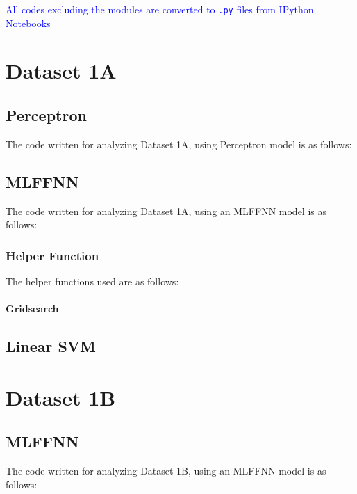 \documentclass[11pt,a4paper]{article}
\newcommand{\noi}{\noindent}
\def\tt#1{\texttt{#1}}
\begin{document}
{\hypersetup{linkcolor=black}
 \tableofcontents}
\break

\noi
\textcolor{blue}{All codes excluding the modules are converted to \tt{.py} files from IPython Notebooks}

\section{Dataset 1A}
\subsection{Perceptron}
The code written for analyzing Dataset 1A, using Perceptron model is as follows:\vspace{-1em}


\subsection{MLFFNN}
The code written for analyzing Dataset 1A, using an MLFFNN model is as follows:\vspace{-1em}


\subsubsection{Helper Function}
The helper functions used are as follows:\vspace{-1em}
\paragraph{Gridsearch}
\vspace{-1.5em}



\subsection{Linear SVM}

\section{Dataset 1B}
\subsection{MLFFNN}
The code written for analyzing Dataset 1B, using an MLFFNN model is as follows:\vspace{-1em}

\end{document}

